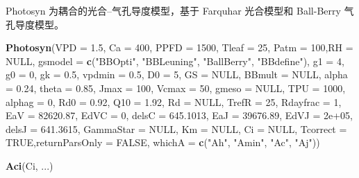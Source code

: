 \documentclass[]{krantz}
\makeatletter
\newenvironment{Shaded}{\begin{snugshade}}{\end{snugshade}}
\newcommand{\KeywordTok}[1]{\textcolor[rgb]{0.13,0.29,0.53}{\textbf{#1}}}
\newcommand{\DataTypeTok}[1]{\textcolor[rgb]{0.13,0.29,0.53}{#1}}
\newcommand{\DecValTok}[1]{\textcolor[rgb]{0.00,0.00,0.81}{#1}}
\newcommand{\FloatTok}[1]{\textcolor[rgb]{0.00,0.00,0.81}{#1}}
\newcommand{\StringTok}[1]{\textcolor[rgb]{0.31,0.60,0.02}{#1}}
\newcommand{\OtherTok}[1]{\textcolor[rgb]{0.56,0.35,0.01}{#1}}
\newcommand{\NormalTok}[1]{#1}
\newenvironment{kframe}{%
\medskip{}
\setlength{\fboxsep}{.8em}
 \def\at@end@of@kframe{}%
 \ifinner\ifhmode%
  \def\at@end@of@kframe{\end{minipage}}%
  \begin{minipage}{\columnwidth}%
 \fi\fi%
 \def\FrameCommand##1{\hskip\@totalleftmargin \hskip-\fboxsep
 \colorbox{shadecolor}{##1}\hskip-\fboxsep
     \hskip-\linewidth \hskip-\@totalleftmargin \hskip\columnwidth}%
 \MakeFramed {\advance\hsize-\width
   \@totalleftmargin\z@ \linewidth\hsize
   \@setminipage}}%
 {\par\unskip\endMakeFramed%
 \at@end@of@kframe}
\renewenvironment{Shaded}{\begin{kframe}}{\end{kframe}}
\theoremstyle{definition}
\theoremstyle{definition}
\theoremstyle{definition}
\theoremstyle{remark}
\makeatother
\begin{document}
Photosyn 为耦合的光合--气孔导度模型，基于 Farquhar 光合模型和 Ball-Berry
气孔导度模型。

\begin{Shaded}
\begin{Highlighting}[]
\KeywordTok{Photosyn}\NormalTok{(}\DataTypeTok{VPD =} \FloatTok{1.5}\NormalTok{, }\DataTypeTok{Ca =} \DecValTok{400}\NormalTok{, }\DataTypeTok{PPFD =} \DecValTok{1500}\NormalTok{,}
         \DataTypeTok{Tleaf =} \DecValTok{25}\NormalTok{, }\DataTypeTok{Patm =} \DecValTok{100}\NormalTok{,}\DataTypeTok{RH =} \OtherTok{NULL}\NormalTok{,}
         \DataTypeTok{gsmodel =} \KeywordTok{c}\NormalTok{(}\StringTok{"BBOpti"}\NormalTok{, }\StringTok{"BBLeuning"}\NormalTok{, }
                     \StringTok{"BallBerry"}\NormalTok{, }\StringTok{"BBdefine"}\NormalTok{),}
         \DataTypeTok{g1 =} \DecValTok{4}\NormalTok{, }\DataTypeTok{g0 =} \DecValTok{0}\NormalTok{, }\DataTypeTok{gk =} \FloatTok{0.5}\NormalTok{, }\DataTypeTok{vpdmin =} \FloatTok{0.5}\NormalTok{,}
         \DataTypeTok{D0 =} \DecValTok{5}\NormalTok{, }\DataTypeTok{GS =} \OtherTok{NULL}\NormalTok{, }\DataTypeTok{BBmult =} \OtherTok{NULL}\NormalTok{, }
         \DataTypeTok{alpha =} \FloatTok{0.24}\NormalTok{, }\DataTypeTok{theta =} \FloatTok{0.85}\NormalTok{, }\DataTypeTok{Jmax =} \DecValTok{100}\NormalTok{,}
         \DataTypeTok{Vcmax =} \DecValTok{50}\NormalTok{, }\DataTypeTok{gmeso =} \OtherTok{NULL}\NormalTok{, }\DataTypeTok{TPU =} \DecValTok{1000}\NormalTok{, }
         \DataTypeTok{alphag =} \DecValTok{0}\NormalTok{, }\DataTypeTok{Rd0 =} \FloatTok{0.92}\NormalTok{, }\DataTypeTok{Q10 =} \FloatTok{1.92}\NormalTok{,}
         \DataTypeTok{Rd =} \OtherTok{NULL}\NormalTok{, }\DataTypeTok{TrefR =} \DecValTok{25}\NormalTok{, }\DataTypeTok{Rdayfrac =} \DecValTok{1}\NormalTok{, }
         \DataTypeTok{EaV =} \FloatTok{82620.87}\NormalTok{, }\DataTypeTok{EdVC =} \DecValTok{0}\NormalTok{, }\DataTypeTok{delsC =} \FloatTok{645.1013}\NormalTok{, }
         \DataTypeTok{EaJ =} \FloatTok{39676.89}\NormalTok{, }\DataTypeTok{EdVJ =} \FloatTok{2e+05}\NormalTok{, }\DataTypeTok{delsJ =} \FloatTok{641.3615}\NormalTok{,}
         \DataTypeTok{GammaStar =} \OtherTok{NULL}\NormalTok{, }\DataTypeTok{Km =} \OtherTok{NULL}\NormalTok{, }\DataTypeTok{Ci =} \OtherTok{NULL}\NormalTok{, }
         \DataTypeTok{Tcorrect =} \OtherTok{TRUE}\NormalTok{,}\DataTypeTok{returnParsOnly =} \OtherTok{FALSE}\NormalTok{,}
         \DataTypeTok{whichA =} \KeywordTok{c}\NormalTok{(}\StringTok{"Ah"}\NormalTok{, }\StringTok{"Amin"}\NormalTok{, }\StringTok{"Ac"}\NormalTok{, }\StringTok{"Aj"}\NormalTok{))}

\KeywordTok{Aci}\NormalTok{(Ci, ...)}
\end{Highlighting}
\end{Shaded}
\end{document}
